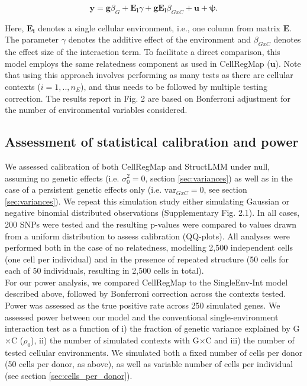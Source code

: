 \begin{equation}
 \mathbf{y} = \mathbf{g}\beta_G + \mathbf{E_i}\gamma + \mathbf{g} \mathbf{E_i} \beta_{GxC} + \mathbf{u} +\boldsymbol{\psi}.
\end{equation}

Here, $\mathbf{E_i}$ denotes a single cellular environment, i.e., one column from matrix $\mathbf{E}$. 
The parameter $\gamma$ denotes the additive effect of the environment and $\beta_{GxC}$ denotes the effect size of the interaction term.
To facilitate a direct comparison, this model employs the same relatedness component as used in CellRegMap ($\mathbf{u}$).
Note that using this approach involves performing as many tests as there are cellular contexts ($i = 1,..,n_E$), and thus needs to be followed by multiple testing correction.
The results report in Fig. 2 are based on Bonferroni adjustment for the number of environmental variables considered.

\subsection{Assessment of statistical calibration and power}

We assessed calibration of both CellRegMap and StructLMM under null, assuming no genetic effects (i.e. $\sigma_0^2 = 0$, section \ref{sec:variances}) as well as in the case of a persistent genetic effects only (i.e. $\text{var}_{GxC} = 0$, see section \ref{sec:variances}).
We repeat this simulation study either simulating  Gaussian or negative binomial distributed observations (Supplementary Fig. 2.1).
In all cases, 200 SNPs were tested and the resulting p-values were compared to values drawn from a uniform distribution to assess calibration (QQ-plots).
All analyses were performed both in the case of no relatedness, modelling 2,500 independent cells (one cell per individual) and in the presence of repeated structure (50 cells for each of 50 individuals, resulting in 2,500 cells in total). \\

For our power analysis, we compared CellRegMap to the SingleEnv-Int model described above, followed by Bonferroni correction across the contexts tested.
Power was assessed as the true positive rate across 250 simulated genes.
We assessed power between our model and the conventional single-environment interaction test as a function of i) the fraction of genetic variance explained by G$\times$C ($\rho_0$), ii) the number of simulated contexts with G$\times$C and iii) the number of tested cellular environments.
We simulated both a fixed number of cells per donor (50 cells per donor, as above), as well as variable number of cells per individual (see section \ref{sec:cells_per_donor}). \\

